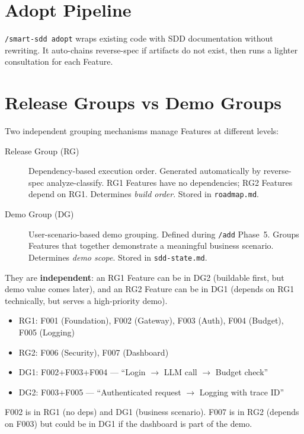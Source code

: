 \documentclass[11pt,a4paper,openright,twoside]{report}
\newcommand{\cmd}[1]{\texttt{/#1}}
\newcommand{\file}[1]{\texttt{#1}}
\begin{document}
\section{Adopt Pipeline}

\texttt{/smart-sdd adopt} wraps existing code with SDD documentation without rewriting. It auto-chains reverse-spec if artifacts do not exist, then runs a lighter consultation for each Feature.

\section{Release Groups vs Demo Groups}

Two independent grouping mechanisms manage Features at different levels:

\begin{description}
  \item[Release Group (RG)] Dependency-based execution order. Generated automatically by reverse-spec analyze-classify. RG1 Features have no dependencies; RG2 Features depend on RG1. Determines \emph{build order}. Stored in \file{roadmap.md}.
  \item[Demo Group (DG)] User-scenario-based demo grouping. Defined during \cmd{add} Phase~5. Groups Features that together demonstrate a meaningful business scenario. Determines \emph{demo scope}. Stored in \file{sdd-state.md}.
\end{description}

They are \textbf{independent}: an RG1 Feature can be in DG2 (buildable first, but demo value comes later), and an RG2 Feature can be in DG1 (depends on RG1 technically, but serves a high-priority demo).

\begin{tipbox}
\begin{itemize}[nosep]
  \item RG1: F001 (Foundation), F002 (Gateway), F003 (Auth), F004 (Budget), F005 (Logging)
  \item RG2: F006 (Security), F007 (Dashboard)
  \item DG1: F002+F003+F004 --- ``Login $\rightarrow$ LLM call $\rightarrow$ Budget check''
  \item DG2: F003+F005 --- ``Authenticated request $\rightarrow$ Logging with trace ID''
\end{itemize}
F002 is in RG1 (no deps) and DG1 (business scenario). F007 is in RG2 (depends on F003) but could be in DG1 if the dashboard is part of the demo.
\end{tipbox}
\end{document}
